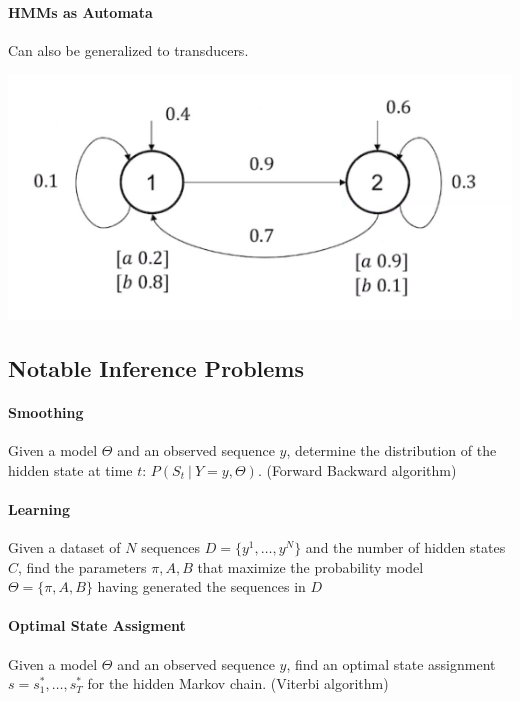 \documentclass[10pt]{report}
\begin{document}
\paragraph{HMMs as Automata} Can also be generalized to transducers.
\begin{center}
	\includegraphics[scale=0.5]{29.png}
\end{center}
\subsection{Notable Inference Problems}
\paragraph{Smoothing} Given a model $\Theta$ and an observed sequence $y$, determine the distribution of the hidden state at time $t$: $P(S_t\:|\:Y=y,\Theta)$. (Forward Backward algorithm)
\paragraph{Learning} Given a dataset of $N$ sequences $D=\{y^1,\ldots,y^N\}$ and the number of hidden states $C$, find the parameters $\pi,A,B$ that maximize the probability model $\Theta = \{\pi,A,B\}$ having generated the sequences in $D$
\paragraph{Optimal State Assigment} Given a model $\Theta$ and an observed sequence $y$, find an optimal state assignment $s = s_1^*,\ldots,s_T^*$ for the hidden Markov chain. (Viterbi algorithm)
\end{document}
